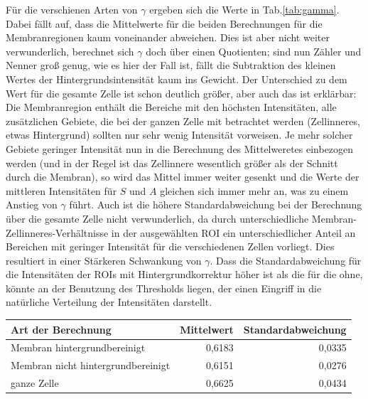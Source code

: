Für die verschienen Arten von $\gamma$ ergeben sich die Werte in Tab.\ref{tab:gamma}. Dabei fällt auf, dass die Mittelwerte für die beiden 
Berechnungen für die Membranregionen kaum voneinander abweichen. Dies ist aber nicht weiter verwunderlich, berechnet sich $\gamma$ doch 
über einen Quotienten; sind nun Zähler und Nenner groß genug, wie es hier der Fall ist, fällt die Subtraktion des kleinen Wertes der 
Hintergrundsintensität kaum ins Gewicht. Der Unterschied zu dem Wert für die gesamte Zelle ist schon deutlich größer, aber auch das 
ist erklärbar: Die Membranregion enthält die Bereiche mit den höchsten Intensitäten, alle zusätzlichen Gebiete, die bei der ganzen Zelle 
mit betrachtet werden (Zellinneres, etwas Hintergrund) sollten nur sehr wenig Intensität vorweisen. Je mehr solcher Gebiete geringer 
Intensität nun in die Berechnung des Mittelweretes einbezogen werden (und in der Regel ist das Zellinnere wesentlich größer als der 
Schnitt durch die Membran), so wird das Mittel immer weiter gesenkt und die Werte der mittleren Intensitäten für $S$ und $A$ gleichen sich 
immer mehr an, was zu einem Anstieg von $\gamma$ führt. Auch ist die höhere Standardabweichung bei der Berechnung über die gesamte Zelle 
nicht verwunderlich, da durch unterschiedliche Membran-Zellinneres-Verhältnisse in der ausgewählten ROI ein unterschiedlicher Anteil an 
Bereichen mit geringer Intensität für die verschiedenen Zellen vorliegt. Dies resultiert in einer Stärkeren Schwankung von $\gamma$. 
Dass die Standardabweichung für die Intensitäten der ROIs mit Hintergrundkorrektur höher ist als die für die ohne, könnte an der Benutzung 
des Thresholds liegen, der einen Eingriff in die natürliche Verteilung der Intensitäten darstellt.

\begin{center}
    \centering
    \begin{tabular}{lrr}
        Art der Berechnung & Mittelwert & Standardabweichung \\
        \hline
        Membran hintergrundbereinigt & 0,6183 & 0,0335 \\
        Membran nicht hintergrundbereinigt & 0,6151 & 0,0276 \\
        ganze Zelle & 0,6625 & 0,0434 \\
        
    \end{tabular}
\end{center}
\label{tab:gamma}




